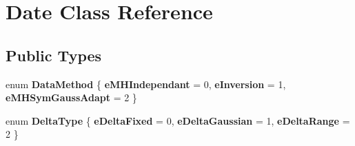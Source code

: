 \hypertarget{class_date}{\section{Date Class Reference}
\label{class_date}
}
\subsection*{Public Types}
\begin{DoxyCompactItemize}
\item 
enum {\bfseries Data\-Method} \{ {\bfseries e\-M\-H\-Independant} = 0, 
{\bfseries e\-Inversion} = 1, 
{\bfseries e\-M\-H\-Sym\-Gauss\-Adapt} = 2
 \}
\item 
enum {\bfseries Delta\-Type} \{ {\bfseries e\-Delta\-Fixed} = 0, 
{\bfseries e\-Delta\-Gaussian} = 1, 
{\bfseries e\-Delta\-Range} = 2
 \}
\end{DoxyCompactItemize}
